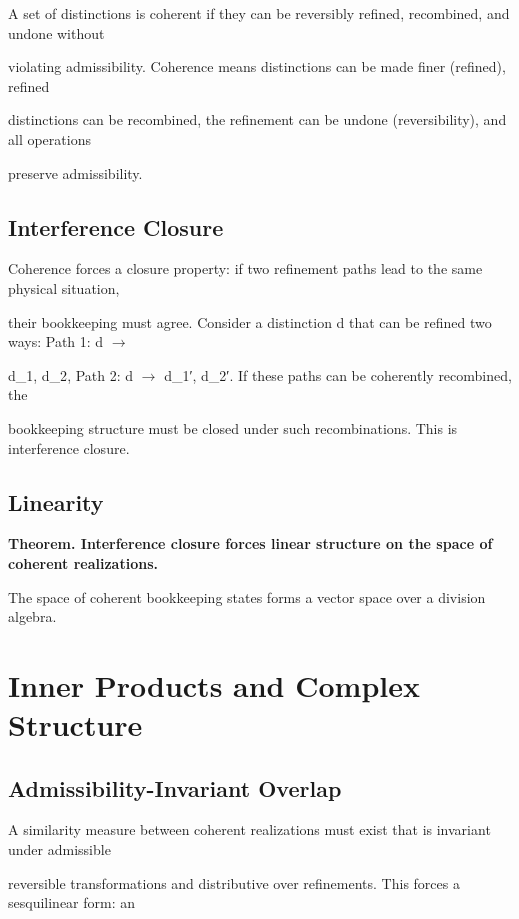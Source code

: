 \documentclass[11pt]{article}
\begin{document}
A set of distinctions is coherent if they can be reversibly refined, recombined, and undone without

violating admissibility. Coherence means distinctions can be made finer (refined), refined

distinctions can be recombined, the refinement can be undone (reversibility), and all operations

preserve admissibility.



\subsection{Interference Closure}

Coherence forces a closure property: if two refinement paths lead to the same physical situation,

their bookkeeping must agree. Consider a distinction d that can be refined two ways: Path 1: d $\to$

{d_1, d_2}, Path 2: d $\to$ {d_1′, d_2′}. If these paths can be coherently recombined, the

bookkeeping structure must be closed under such recombinations. This is interference closure.



\subsection{Linearity}

\textbf{Theorem. Interference closure forces linear structure on the space of coherent realizations.}

The space of coherent bookkeeping states forms a vector space over a division algebra.



\section{Inner Products and Complex Structure}



\subsection{Admissibility-Invariant Overlap}

A similarity measure between coherent realizations must exist that is invariant under admissible

reversible transformations and distributive over refinements. This forces a sesquilinear form: an
\end{document}
